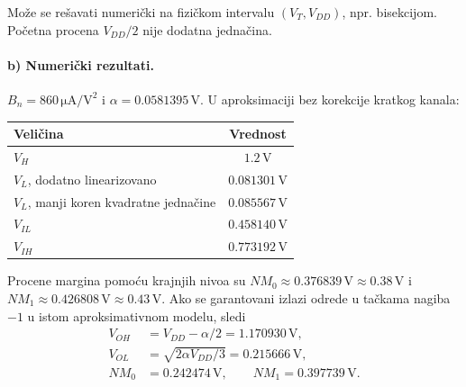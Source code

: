 \documentclass[a4paper,11pt]{article}
\numberwithin{equation}{section}
\newcommand{\redlinija}{\arrayrulecolor{black!28}\specialrule{0.3pt}{2pt}{2pt}\arrayrulecolor{black}}
\begin{document}
Može se rešavati numerički na fizičkom intervalu $(V_T,V_{DD})$, npr. bisekcijom. Početna procena $V_{DD}/2$ nije dodatna jednačina.
\FloatBarrier{}\paragraph{b) Numerički rezultati.}
$B_n=860\,\mathrm{\mu A/V^2}$ i $\alpha=0.0581395\,\mathrm V$. U aproksimaciji bez korekcije kratkog kanala:
\begin{center}\begin{minipage}{\linewidth}\centering{}\label{tab:1.nivoi}\begin{tabular}{lc}\toprule
Veličina & Vrednost\\
\midrule
$V_H$ & $1.2\,\mathrm V$\\
\redlinija
$V_L$, dodatno linearizovano & $0.081301\,\mathrm V$\\
\redlinija
$V_L$, manji koren kvadratne jednačine & $0.085567\,\mathrm V$\\
\redlinija
$V_{IL}$ & $0.458140\,\mathrm V$\\
\redlinija
$V_{IH}$ & $0.773192\,\mathrm V$\\
\bottomrule\end{tabular}\end{minipage}\end{center}
Procene margina pomoću krajnjih nivoa su $NM_0\approx0.376839\,\mathrm V\approx0.38\,\mathrm V$ i $NM_1\approx0.426808\,\mathrm V\approx0.43\,\mathrm V$. Ako se garantovani izlazi odrede u tačkama nagiba $-1$ u istom aproksimativnom modelu, sledi
\begin{equation}\label{eq:1.11}
\begin{aligned}V_{OH}&=V_{DD}-\alpha/2=1.170930\,\mathrm V,\\ V_{OL}&=\sqrt{2\alpha V_{DD}/3}=0.215666\,\mathrm V,\\ NM_0&=0.242474\,\mathrm V,\qquad NM_1=0.397739\,\mathrm V.\end{aligned}
\end{equation}
\end{document}
